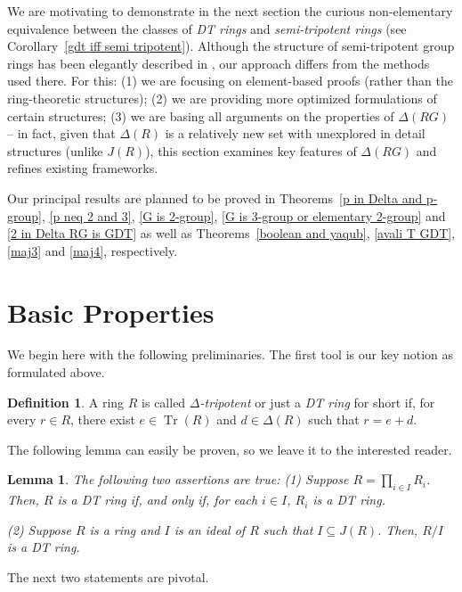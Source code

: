 \documentclass[12pt]{amsart}
\newtheorem{lemma}[theorem]{Lemma}
\theoremstyle{definition}
\newtheorem{definition}[theorem]{Definition}
\begin{document}
\noindent We are motivating to demonstrate in the next section the curious non-elementary equivalence between the classes of \textit{DT rings} and \textit{semi-tripotent rings} (see Corollary~\ref{gdt iff semi tripotent}). Although the structure of semi-tripotent group rings has been elegantly described in \cite{kyzr}, our approach differs from the methods used there. For this: (1) we are focusing on element-based proofs (rather than the ring-theoretic structures); (2) we are providing more optimized formulations of certain structures; (3) we are basing all arguments on the properties of $\Delta(RG)$ -- in fact, given that $\Delta(R)$ is a relatively new set with unexplored in detail structures (unlike $J(R)$), this section examines key features of $\Delta(RG)$ and refines existing frameworks.

\medskip

Our principal results are planned to be proved in Theorems~\ref{p in Delta and p-group}, \ref{p neq 2 and 3}, \ref{G is 2-group}, \ref{G is 3-group or elementary 2-group} and \ref{2 in Delta RG is GDT} as well as Theorems~\ref{boolean and yaqub}, \ref{avali T GDT}, \ref{maj3} and \ref{maj4}, respectively.

\section{Basic Properties}

We begin here with the following preliminaries. The first tool is our key notion as formulated above.

\begin{definition}
A ring $R$ is called {\it $\Delta$-tripotent} or just a \textit{DT ring} for short if, for every $r \in R$, there exist $e \in \operatorname{Tr}(R)$ and $d \in \Delta(R)$ such that $r = e + d$.
\end{definition}

The following lemma can easily be proven, so we leave it to the interested reader.

\begin{lemma}\label{lemma 0} The following two assertions are true:
(1) Suppose \( R = \prod_{i \in I} R_i \). Then, \( R \) is a DT ring if, and only if, for each \( i \in I \), \( R_i \) is a DT ring.

(2) Suppose \( R \) is a ring and \( I \) is an ideal of \( R \) such that \( I \subseteq J(R) \). Then, \( R/I \) is a DT ring.
\end{lemma}

The next two statements are pivotal.
\end{document}
